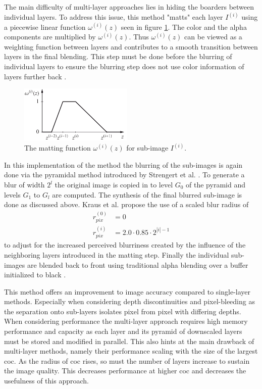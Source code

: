 The main difficulty of multi-layer approaches lies in hiding the boarders between individual layers.
To address this issue, this method "matts" each layer $I^{(i)}$ using a piecewise linear function $\omega^{(i)}(z)$ seen in figure \ref{fig:matt-func}.
The color and the alpha components are multiplied by $\omega^{(i)}(z)$.
Thus $\omega^{(i)}(z)$ can be viewed as a weighting function between layers and contributes to a smooth transition between layers in the final blending.
This step must be done before the blurring of individual layers to ensure the blurring step does not use color information of layers further back \cite{Kraus.2007}.

\begin{figure}
\begin{center}
    \includegraphics[width=0.48\textwidth]{images/matt-function.png}
\end{center}
\caption{The matting function $\omega^{(i)}(z)$ for sub-image $I^{(i)}$.\cite{Kraus.2007}}
\label{fig:matt-func}
\end{figure}

In this implementation of the method the blurring of the sub-images is again done via the pyramidal method introduced by Strengert et al. \cite{Strengert.2006}.
To generate a blur of width $2^l$ the original image is copied in to level $G_0$ of the pyramid and levels $G_1$ to $G_l$ are computed.
The synthesis of the final blurred sub-image is done as discussed above.
Kraus et al. propose the use of a scaled blur radius of
\begin{align}
    r^{(0)}_{pix} &= 0 \\
    r^{(i)}_{pix} &= 2.0 \cdot 0.85 \cdot 2^{|i| - 1}
\end{align}
to adjust for the increased perceived blurriness created by the influence of the neighboring layers introduced in the matting step.
Finally the individual sub-images are blended back to front using traditional alpha blending over a buffer initialized to black \cite{Kraus.2007}.

This method offers an improvement to image accuracy compared to single-layer methods.
Especially when considering depth discontinuities and pixel-bleeding as the separation onto sub-layers isolates pixel from pixel with differing depths.
When considering performance the multi-layer approach requires high memory performance and capacity as each layer and its pyramid of downscaled layers must be stored and modified in parallel.
This also hints at the main drawback of multi-layer methods, namely their performance scaling with the size of the largest \gls{coc}.
As the radius of \gls{coc} rises, so must the number of layers increase to sustain the image quality.
This decreases performance at higher \gls{coc} and decreases the usefulness of this approach.